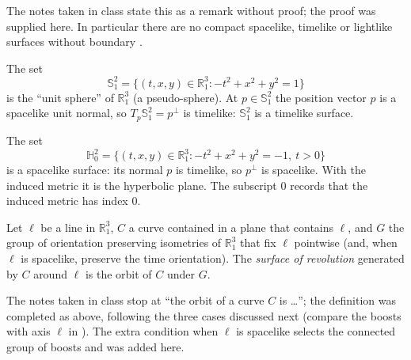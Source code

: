 The notes taken in class state this as a
remark without proof; the proof was
supplied here. In particular there are no
compact spacelike, timelike or lightlike
surfaces without boundary
\cite[Section 3.1]{lopez2014differential}.

\begin{example}
\label{example-palmas-de-sitter}
The set
$$
\mathbb{S}^2_1=\{(t,x,y)\in\mathbb{R}^3_1
: -t^2+x^2+y^2=1\}
$$
is the ``unit sphere'' of
$\mathbb{R}^3_1$ (a pseudo-sphere). At
$p\in\mathbb{S}^2_1$ the position vector
$p$ is a spacelike unit normal, so
$T_p\mathbb{S}^2_1=p^{\perp}$ is timelike:
$\mathbb{S}^2_1$ is a timelike surface.
\end{example}

\begin{example}
\label{example-palmas-hyperbolic-plane}
The set
$$
\mathbb{H}^2_0=\{(t,x,y)\in\mathbb{R}^3_1
: -t^2+x^2+y^2=-1,\ t>0\}
$$
is a spacelike surface: its normal $p$ is
timelike, so $p^{\perp}$ is spacelike. With
the induced metric it is the hyperbolic
plane. The subscript $0$ records that the
induced metric has index $0$.
\end{example}

\begin{definition}
\label{definition-palmas-revolution}
Let $\ell$ be a line in $\mathbb{R}^3_1$,
$C$ a curve contained in a plane that
contains $\ell$, and $G$ the group of
orientation preserving isometries of
$\mathbb{R}^3_1$ that fix $\ell$ pointwise
(and, when $\ell$ is spacelike, preserve
the time orientation). The \emph{surface
of revolution} generated by $C$ around
$\ell$ is the orbit of $C$ under $G$.
\end{definition}

The notes taken in class stop at ``the
orbit of a curve $C$ is \dots''; the
definition was completed as above,
following the three cases discussed next
(compare the boosts with axis $\ell$ in
\cite[Section 1.3]{lopez2014differential}).
The extra condition when $\ell$ is
spacelike selects the connected group of
boosts and was added here.

